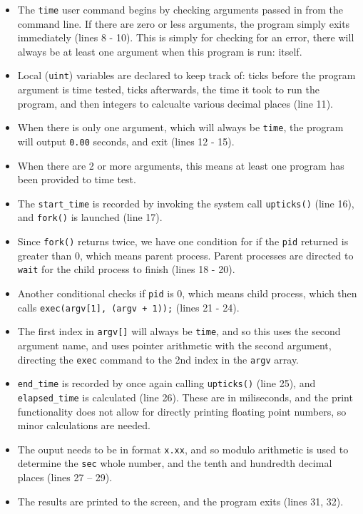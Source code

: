 \documentclass[11pt,letterpaper]{report}
\begin{document}
	\begin{itemize}
		\item The {\tt time} user command begins by checking arguments passed in from the command line. If there are zero or less arguments, the program simply exits immediately ({\color{red}lines 8 - 10}). This is simply for checking for an error, there will always be at least one argument when this program is run: itself.
		\item Local ({\tt uint}) variables are declared to keep track of: ticks before the program argument is time tested, ticks afterwards, the time it took to run the program, and then integers to calcualte various decimal places ({\color{red}line 11}).
		\item When there is only one argument, which will always be {\tt time}, the program will output {\tt 0.00} seconds, and exit ({\color{red}lines 12 - 15}).
		\item When there are 2 or more arguments, this means at least one program has been provided to time test.
		\item The {\tt start\_time} is recorded by invoking the system call {\tt upticks()} ({\color{red}line 16}), and {\tt fork()} is launched ({\color{red}line 17}).
		\item Since {\tt fork()} returns twice, we have one condition for if the {\tt pid} returned is greater than 0, which means parent process. Parent processes are directed to {\tt wait} for the child process to finish ({\color{red}lines 18 - 20}).
		\item Another conditional checks if {\tt pid} is 0, which means child process, which then calls {\tt exec(argv[1], (argv + 1));} ({\color{red}lines 21 - 24}).
		\item The first index in {\tt argv[]} will always be {\tt time}, and so this uses the second argument name, and uses pointer arithmetic with the second argument, directing the {\tt exec} command to the 2nd index in the {\tt argv} array.
		\item {\tt end\_time} is recorded by once again calling {\tt upticks()} ({\color{red}line 25}), and {\tt elapsed\_time} is calculated ({\color{red}line 26}). These are in miliseconds, and the print functionality does not allow for directly printing floating point numbers, so minor calculations are needed.
		\item The ouput needs to be in format {\tt x.xx}, and so modulo arithmetic is used to determine the {\tt sec} whole number, and the tenth and hundredth decimal places ({\color{red}lines 27 -- 29}).
		\item The results are printed to the screen, and the program exits ({\color{red}lines 31, 32}).
	\end{itemize}
	
\end{document}
